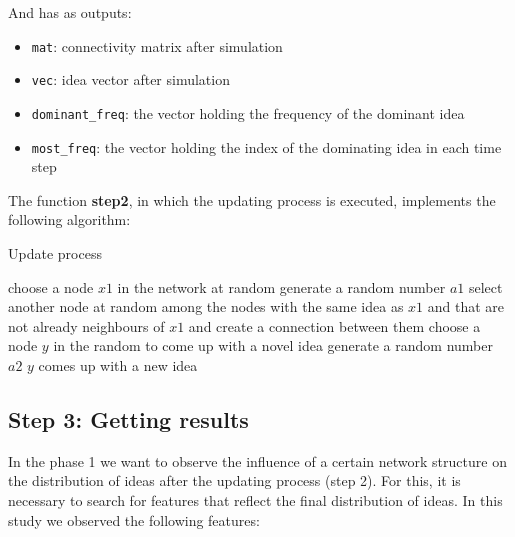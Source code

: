  And has as outputs:
 \begin{itemize}
 \item \verb+mat+: connectivity matrix after simulation
\item \verb+vec+: idea vector after simulation
\item \verb+dominant_freq+: the vector holding the frequency of the dominant idea
 \item \verb+most_freq+: the vector holding the index of the dominating idea in each time step
\end{itemize}

\bigskip
\noindent The function \textbf{step2}, in which the updating process is executed, implements the following algorithm:

\begin{algorithm}                      %
\caption{Update process}          %
\label{alg1}                           %
\begin{algorithmic}                    %
    	\State choose a node $x1$ in the network at random
	\State generate a random number $a1$
     
        \State select another node at random among the nodes with the same idea as $x1$ and that are not already neighbours of $x1$ and create a connection between them
            \EndIf
    \State choose a node $y$ in the random to come up with a novel idea
    \State generate a random number $a2$
     $y$ comes up with a new idea 
     \EndIf
   \EndFor
\end{algorithmic}
\end{algorithm}

\subsection{Step 3: Getting results}

In the phase 1 we want to observe the influence of a certain network structure  on the distribution of ideas after the updating process (step 2). For this, it is necessary to search for features that reflect the final distribution of ideas. In this study we observed the following features:

